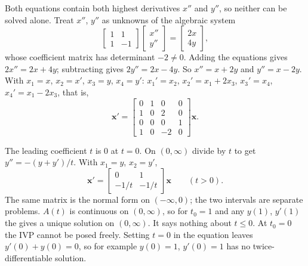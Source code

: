 \documentclass[10pt]{scrartcl}
\newcommand{\vv}[1]{\mathbf{#1}}
\begin{document}
\begin{example*}[Coupled highest derivatives: $x''+y''=2x$, $x''-y''=4y$]
  \begin{steps}
    \ii Both equations contain both highest derivatives $x''$ and $y''$, so neither can be solved alone. Treat $x''$, $y''$ as unknowns of the algebraic system
    \[
      \begin{bmatrix}1&1\\1&-1\end{bmatrix}\begin{bmatrix}x''\\y''\end{bmatrix}=\begin{bmatrix}2x\\4y\end{bmatrix},
    \]
    whose coefficient matrix has determinant $-2\neq 0$. Adding the equations gives $2x''=2x+4y$; subtracting gives $2y''=2x-4y$. So $x''=x+2y$ and $y''=x-2y$.
    \ii With $x_1=x$, $x_2=x'$, $x_3=y$, $x_4=y'$: $x_1'=x_2$, $x_2'=x_1+2x_3$, $x_3'=x_4$, $x_4'=x_1-2x_3$, that is,
    \[
      \vv x'=\begin{bmatrix}0&1&0&0\\1&0&2&0\\0&0&0&1\\1&0&-2&0\end{bmatrix}\vv x.
    \]
  \end{steps}
\end{example*}

\begin{example*}[A leading coefficient that vanishes: $ty''+y'+y=0$]
  \begin{steps}
    \ii The leading coefficient $t$ is $0$ at $t=0$. On $(0,\infty)$ divide by $t$ to get $y''=-(y+y')/t$. With $x_1=y$, $x_2=y'$,
    \[
      \vv x'=\begin{bmatrix}0&1\\-1/t&-1/t\end{bmatrix}\vv x\qquad(t>0).
    \]
    The same matrix is the normal form on $(-\infty,0)$; the two intervals are separate problems.
    \ii $A(t)$ is continuous on $(0,\infty)$, so for $t_0=1$ and any $y(1)$, $y'(1)$ the  gives a unique solution on $(0,\infty)$. It says nothing about $t\le 0$.
    \ii At $t_0=0$ the IVP cannot be posed freely. Setting $t=0$ in the equation leaves $y'(0)+y(0)=0$, so for example $y(0)=1$, $y'(0)=1$ has no twice-differentiable solution.
  \end{steps}
\end{example*}
\end{document}
